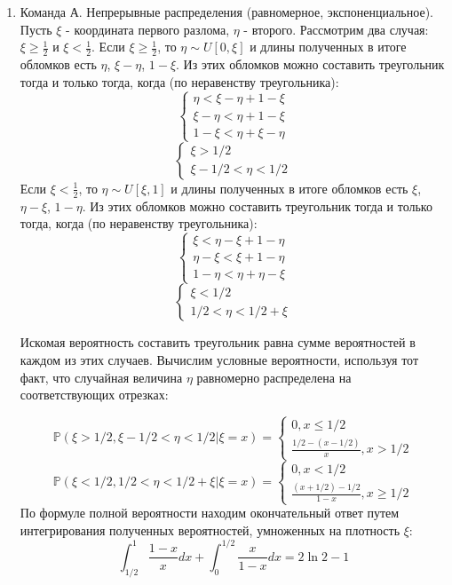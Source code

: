 \documentclass[a4paper,12pt]{article}
\def \P{\mathbb{P}}
\begin{document}
\begin{enumerate}
\item Команда А. Непрерывные распределения (равномерное, экспоненциальное).
Пусть $\xi$ - координата первого разлома, $\eta$ - второго. Рассмотрим два случая: $\xi\geq\frac{1}{2}$ и $\xi<\frac{1}{2}$.
Если $\xi\geq\frac{1}{2}$, то $\eta \sim U[0,\xi]$ и длины полученных в итоге обломков есть $\eta$, $\xi-\eta$, $1-\xi$. Из этих обломков можно составить треугольник тогда и только тогда, когда (по неравенству треугольника):
\[\begin{cases} \eta < \xi-\eta+1-\xi\\
\xi-\eta<\eta+1-\xi\\
1-\xi<\eta+\xi-\eta
\end{cases}
\]
\[\begin{cases} \xi>1/2\\
\xi-1/2<\eta<1/2
\end{cases}
\]
Если $\xi<\frac{1}{2}$, то $\eta \sim U[\xi,1]$ и длины полученных в итоге обломков есть $\xi$, $\eta-\xi$, $1-\eta$. Из этих обломков можно составить треугольник тогда и только тогда, когда (по неравенству треугольника):
\[\begin{cases} \xi < \eta-\xi+1-\eta\\
\eta-\xi<\xi+1-\eta\\
1-\eta<\eta+\eta-\xi
\end{cases}
\]
\[\begin{cases} \xi<1/2\\
1/2<\eta<1/2+\xi
\end{cases}
\]

Искомая вероятность составить треугольник равна сумме вероятностей в каждом из этих случаев. Вычислим условные вероятности, используя тот факт, что случайная величина $\eta$ равномерно распределена на соответствующих отрезках:

\[\P(\xi>1/2,\xi-1/2<\eta<1/2 | \xi=x)=\begin{cases}0,x\leq1/2\\
\frac{1/2-(x-1/2)}{x}, x>1/2
\end{cases}
\]
\[\P(\xi<1/2,1/2<\eta<1/2+\xi|\xi=x)=\begin{cases}0,x<1/2\\
\frac{(x+1/2)-1/2}{1-x}, x\geq1/2
\end{cases}
\]
По формуле полной вероятности находим окончательный ответ путем интегрирования полученных вероятностей, умноженных на плотность $\xi$:
\[\int^1_{1/2}\frac{1-x}{x}dx+\int^{1/2}_0\frac{x}{1-x}dx=2\ln2-1\]
\end{enumerate}
\end{document}
